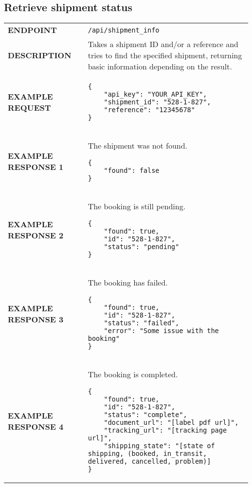 \documentclass{article}
\begin{document}
\subsection{Retrieve shipment status}
\begin{tabular}{l|p{10cm}}
	\textbf{ENDPOINT} & \verb|/api/shipment_info|\\
	\textbf{DESCRIPTION} & Takes a shipment ID and/or a reference and tries to find the specified shipment, returning basic information depending on the result.\\
	\textbf{EXAMPLE REQUEST} & \begin{lstlisting}
{
    "api_key": "YOUR_API_KEY",
    "shipment_id": "528-1-827",
    "reference": "12345678"
}
	\end{lstlisting}\\
	\textbf{EXAMPLE RESPONSE 1} & The shipment was not found. \newline\begin{lstlisting}
{
    "found": false
}
	\end{lstlisting}\\
    \textbf{EXAMPLE RESPONSE 2} & The booking is still pending. \newline\begin{lstlisting}
{
    "found": true,
    "id": "528-1-827",
    "status": "pending"
}
	\end{lstlisting}\\
    \textbf{EXAMPLE RESPONSE 3} & The booking has failed. \newline\begin{lstlisting}
{
    "found": true,
    "id": "528-1-827",
    "status": "failed",
    "error": "Some issue with the booking"
}
	\end{lstlisting}\\
    \textbf{EXAMPLE RESPONSE 4} & The booking is completed. \newline\begin{lstlisting}
{
    "found": true,
    "id": "528-1-827",
    "status": "complete",
    "document_url": "[label pdf url]",
    "tracking_url": "[tracking page url]",
    "shipping_state": "[state of shipping, (booked, in_transit, delivered, cancelled, problem)]
}
	\end{lstlisting}\\
\end{tabular}

\newpage
\end{document}
